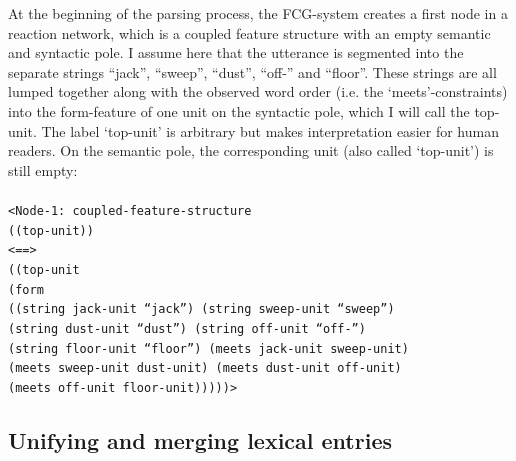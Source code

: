 At the beginning of the parsing process, the FCG-system creates a first node in a reaction network, which is a coupled feature structure with an empty semantic and syntactic pole. I assume here that the utterance is segmented into the separate strings ``jack'', ``sweep'', ``dust'', ``off-'' and ``floor''. These strings are all lumped together along with the observed word order (i.e. the `meets'-constraints) into the form-feature of one unit on the syntactic pole, which I will call the top-unit. The label `top-unit' is arbitrary but makes interpretation easier for human readers. On  the semantic pole, the corresponding unit (also called `top-unit') is still empty:
\\
\\
{\footnotesize{\tt <Node-1: coupled-feature-structure
\\ ((top-unit))
\\ <==>
\\ ((top-unit
\\ \hspace*{5mm} (form 
\\ \hspace*{12mm}((string jack-unit ``jack'') (string sweep-unit ``sweep'')
\\ \hspace*{13mm} (string dust-unit ``dust'') (string off-unit ``off-'')
\\ \hspace*{13mm} (string floor-unit ``floor'') (meets jack-unit sweep-unit)
\\ \hspace*{13mm} (meets sweep-unit dust-unit) (meets dust-unit off-unit)
\\ \hspace*{13mm} (meets off-unit floor-unit)))))>}}

\subsection{Unifying and merging lexical entries}
\label{s:example-parsing}

